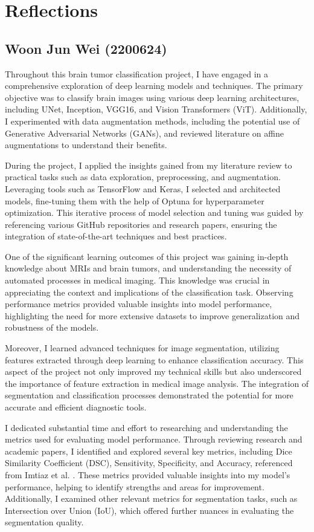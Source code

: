 \section{Reflections}\label{s:reflections}

\subsection{Woon Jun Wei (2200624)}

Throughout this brain tumor classification project, I have engaged in a comprehensive exploration of deep learning models and techniques. The primary objective was to classify brain images using various deep learning architectures, including UNet, Inception, VGG16, and Vision Transformers (ViT). Additionally, I experimented with data augmentation methods, including the potential use of Generative Adversarial Networks (GANs), and reviewed literature on affine augmentations to understand their benefits.

During the project, I applied the insights gained from my literature review to practical tasks such as data exploration, preprocessing, and augmentation. Leveraging tools such as TensorFlow and Keras, I selected and architected models, fine-tuning them with the help of Optuna for hyperparameter optimization. This iterative process of model selection and tuning was guided by referencing various GitHub repositories and research papers, ensuring the integration of state-of-the-art techniques and best practices.

One of the significant learning outcomes of this project was gaining in-depth knowledge about MRIs and brain tumors, and understanding the necessity of automated processes in medical imaging. This knowledge was crucial in appreciating the context and implications of the classification task. Observing performance metrics provided valuable insights into model performance, highlighting the need for more extensive datasets to improve generalization and robustness of the models.

Moreover, I learned advanced techniques for image segmentation, utilizing features extracted through deep learning to enhance classification accuracy. This aspect of the project not only improved my technical skills but also underscored the importance of feature extraction in medical image analysis. The integration of segmentation and classification processes demonstrated the potential for more accurate and efficient diagnostic tools.

I dedicated substantial time and effort to researching and understanding the metrics used for evaluating model performance. Through reviewing research and academic papers, I identified and explored several key metrics, including Dice Similarity Coefficient (DSC), Sensitivity, Specificity, and Accuracy, referenced from Imtiaz et al. \cite{imtiaz_brain_2023}. These metrics provided valuable insights into my model's performance, helping to identify strengths and areas for improvement. Additionally, I examined other relevant metrics for segmentation tasks, such as Intersection over Union (IoU), which offered further nuances in evaluating the segmentation quality.

